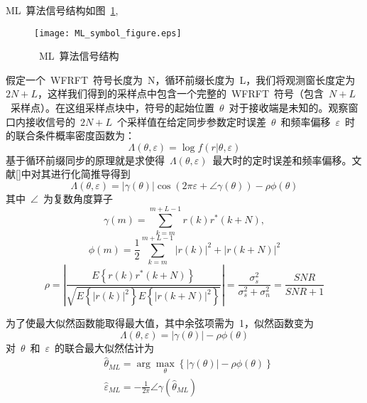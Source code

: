 ML~算法信号结构如图~\ref{ML_symbol_figure},
\begin{figure}[htbp]
\centering
\texttt{[image: ML\_symbol\_figure.eps]}
\caption{~ML~算法信号结构}\vspace{-1em}\label{ML_symbol_figure}
\end{figure}
假定一个~WFRFT~符号长度为~N，循环前缀长度为~L，我们将观测窗长度定为~$2N+L$，这样我们得到的采样点中包含一个完整的~WFRFT~符号（包含~$N+L$~采样点）。在这组采样点块中，符号的起始位置~$\theta$~对于接收端是未知的。观察窗口内接收信号的~$2N+L$~个采样值在给定同步参数定时误差~$\theta$~和频率偏移~$\varepsilon$~时的联合条件概率密度函数为：
\begin{equation}
\Lambda \left( {\theta ,\varepsilon } \right) = \log f\left( {r|\theta ,\varepsilon } \right)
\end{equation}
基于循环前缀同步的原理就是求使得~$\Lambda \left( {\theta ,\varepsilon } \right)$~最大时的定时误差和频率偏移。文献[]中对其进行化简推导得到
\begin{equation}
\Lambda \left( {\theta ,\varepsilon } \right) = \left| {\gamma \left( \theta  \right)} \right|\cos \left( {2\pi \varepsilon  + \angle \gamma \left( \theta  \right)} \right) - \rho \phi \left( \theta  \right)
\end{equation}
其中~$\angle$~为复数角度算子
\begin{equation}
\gamma \left( m \right) = \sum\limits_{k = m}^{m + L - 1} {r\left( k \right){r^*}\left( {k + N} \right)} ,
\end{equation}
\begin{equation}
\phi \left( m \right) = \frac{1}{2}\sum\limits_{k = m}^{m + L - 1} {{{\left| {r\left( k \right)} \right|}^2} + {{\left| {r\left( {k + N} \right)} \right|}^2}}
\end{equation}
\begin{equation}
\rho  = \left| {\frac{{E\left\{ {r\left( k \right){r^*}\left( {k + N} \right)} \right\}}}{{\sqrt {E\left\{ {{{\left| {r\left( k \right)} \right|}^2}} \right\}E\left\{ {{{\left| {r\left( {k + N} \right)} \right|}^2}} \right\}} }}} \right| = \frac{{\sigma _s^2}}{{\sigma _s^2 + \sigma _n^2}} = \frac{{SNR}}{{SNR + 1}}
\end{equation}

为了使最大似然函数能取得最大值，其中余弦项需为~1，似然函数变为
\begin{equation}
\Lambda \left( {\theta ,\varepsilon } \right) = \left| {\gamma \left( \theta  \right)} \right| - \rho \phi \left( \theta  \right)
\end{equation}
对~$\theta$~和~$\varepsilon$~的联合最大似然估计为
\begin{align}
&{\hat \theta _{ML}} = \arg \mathop {\max }\limits_\theta  \left\{ {\left| {\gamma \left( \theta  \right)} \right| - \rho \phi \left( \theta  \right)} \right\} \\
&{\hat \varepsilon _{ML}} =  - \frac{1}{{2\pi }}\angle \gamma \left( {{{\hat \theta }_{ML}}} \right)
\end{align}

